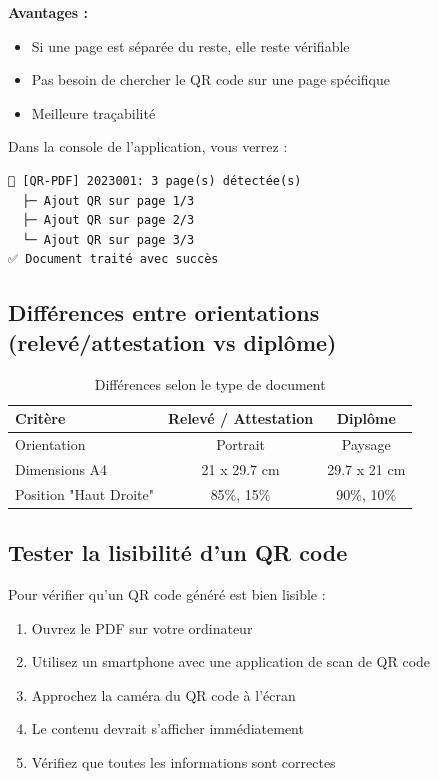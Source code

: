 \textbf{Avantages :}
\begin{itemize}[leftmargin=*]
    \item Si une page est séparée du reste, elle reste vérifiable
    \item Pas besoin de chercher le QR code sur une page spécifique
    \item Meilleure traçabilité
\end{itemize}

\begin{tcolorbox}[colback=blue!5!white,colframe=blue!75!black,title=Logs de traitement multi-pages]
Dans la console de l'application, vous verrez :

\begin{verbatim}
📄 [QR-PDF] 2023001: 3 page(s) détectée(s)
  ├─ Ajout QR sur page 1/3
  ├─ Ajout QR sur page 2/3
  └─ Ajout QR sur page 3/3
✅ Document traité avec succès
\end{verbatim}
\end{tcolorbox}

\subsection{Différences entre orientations (relevé/attestation vs diplôme)}

\begin{table}[h]
\centering
\begin{tabular}{|l|c|c|}
\hline
\textbf{Critère} & \textbf{Relevé / Attestation} & \textbf{Diplôme} \\
\hline
Orientation & Portrait & Paysage \\
\hline
Dimensions A4 & 21 x 29.7 cm & 29.7 x 21 cm \\
\hline
Position "Haut Droite" & 85\%, 15\% & 90\%, 10\% \\
\hline
\end{tabular}
\caption{Différences selon le type de document}
\end{table}

\subsection{Tester la lisibilité d'un QR code}

Pour vérifier qu'un QR code généré est bien lisible :

\begin{enumerate}[leftmargin=*]
    \item Ouvrez le PDF sur votre ordinateur
    \item Utilisez un smartphone avec une application de scan de QR code
    \item Approchez la caméra du QR code à l'écran
    \item Le contenu devrait s'afficher immédiatement
    \item Vérifiez que toutes les informations sont correctes
\end{enumerate}

